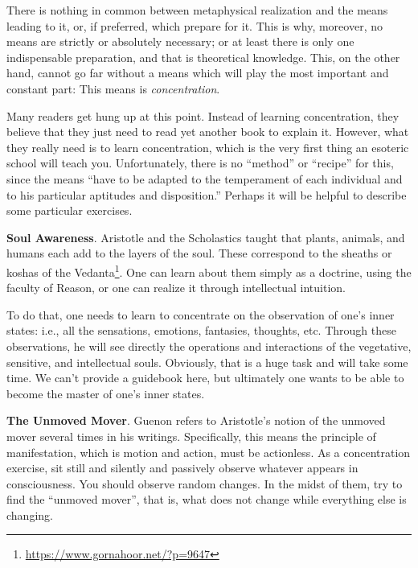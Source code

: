 \begin{quotex}
There is nothing in common between metaphysical realization and the means leading to it, or, if preferred, which prepare for it. This is why, moreover, no means are strictly or absolutely necessary; or at least there is only one indispensable preparation, and that is theoretical knowledge. This, on the other hand, cannot go far without a means which will play the most important and constant part: This means is \emph{concentration}. 

\end{quotex}
Many readers get hung up at this point. Instead of learning concentration, they believe that they just need to read yet another book to explain it. However, what they really need is to learn concentration, which is the very first thing an esoteric school will teach you. Unfortunately, there is no “method” or “recipe” for this, since the means “have to be adapted to the temperament of each individual and to his particular aptitudes and disposition.” Perhaps it will be helpful to describe some particular exercises.

\textbf{Soul Awareness}. Aristotle and the Scholastics taught that plants, animals, and humans each add to the layers of the soul. These correspond to the sheaths or koshas of the Vedanta\footnote{\url{https://www.gornahoor.net/?p=9647}}. One can learn about them simply as a doctrine, using the faculty of Reason, or one can realize it through intellectual intuition.

To do that, one needs to learn to concentrate on the observation of one's inner states: i.e., all the sensations, emotions, fantasies, thoughts, etc. Through these observations, he will see directly the operations and interactions of the vegetative, sensitive, and intellectual souls. Obviously, that is a huge task and will take some time. We can't provide a guidebook here, but ultimately one wants to be able to become the master of one's inner states.

\textbf{The Unmoved Mover}. Guenon refers to Aristotle's notion of the unmoved mover several times in his writings. Specifically, this means the principle of manifestation, which is motion and action, must be actionless. As a concentration exercise, sit still and silently and passively observe whatever appears in consciousness. You should observe random changes. In the midst of them, try to find the “unmoved mover”, that is, what does not change while everything else is changing.

